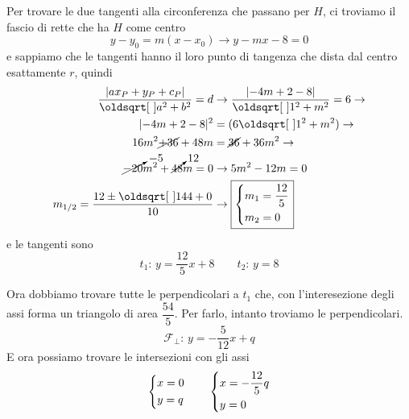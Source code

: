\begin{center}
\end{center}
Per trovare le due tangenti alla circonferenza che passano per $H$, ci troviamo il fascio di rette 
che ha $H$ come centro
\begin{equation*}
  y-y_0=m(x-x_0) \rightarrow y-mx-8=0
\end{equation*}
e sappiamo che le tangenti hanno il loro punto di tangenza che dista dal centro esattamente $r$, 
quindi
\begin{align*}
  \frac{\lvert ax_P + y_P + c_P\rvert}{\sqrt{a^2+b^2}} = d &\rightarrow
  \frac{\lvert-4m+2-8\rvert}{\sqrt{1^2+m^2}} = 6 \rightarrow\\
  \lvert-4m+2-8\rvert^2 &= (6\sqrt{1^2+m^2}) \rightarrow\\
  16m^2\cancel{+36}+48m&=\cancel{36} + 36m^2 \rightarrow\\
  \cancelto{-5}{-20}m^2+\cancelto{12}{48}m = 0 &\rightarrow 5m^2-12m =0 \\
  m_{1/2} = \frac{12\pm\sqrt{144+0}}{10} &\rightarrow \boxed{\begin{dcases}
      m_1 = \frac{12}{5}\\
      m_2 = 0
  \end{dcases}}
\end{align*}
e le tangenti sono
\begin{equation*}
  \boxed{t_1:\,y = \frac{12}{5}x+8 \qquad t_2:\, y=8}
\end{equation*}

Ora dobbiamo trovare tutte le perpendicolari a $t_1$ che, con l'interesezione degli assi forma un
triangolo di area $\dfrac{54}{5}$. Per farlo, intanto troviamo le perpendicolari.
\begin{equation*}
  \mathscr{F_\perp}:\,y=-\frac{5}{12}x + q
\end{equation*}
E ora possiamo trovare le intersezioni con gli assi
\begin{equation*}
  \begin{dcases}
    x = 0\\
    y = q
  \end{dcases}\qquad
  \begin{dcases}
    x = -\frac{12}{5}q\\
    y = 0
  \end{dcases}
\end{equation*}

